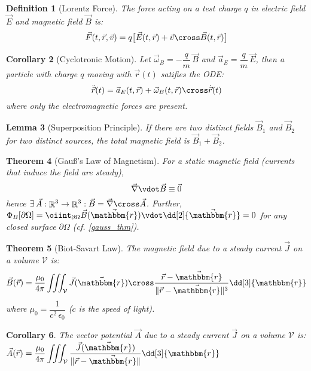 \documentclass[12pt]{article}
\renewcommand{\div}{\vec{\nabla}\vdot}
\renewcommand{\curl}{\vec{\nabla}\cross}
\newcommand{\Exist}[1]{\exists\,{#1}:}
\DeclareMathOperator{\R}{\mathbb{R}}
\newcommand*{\rv}{\vec{r}}
\newcommand*{\ir}{\mathbbm{r}}
\newcommand*{\irv}{\vec{\mathbbm{r}}}
\newcommand*{\vE}{\vec{E}}
\newcommand*{\vB}{\vec{B}}
\newcommand*{\vJ}{\vec{J}}
\newcommand*{\vA}{\vec{A}}
\newcommand*{\ee}{\epsilon_0}
\newcommand*{\mmu}{\mu_0}
\newcommand*{\vol}{\mathcal{V}}
\newtheorem{theorem}{Theorem}[subsection]
\newtheorem{definition}[theorem]{Definition}
\newtheorem{lemma}[theorem]{Lemma}
\newtheorem{corollary}[theorem]{Corollary}
\begin{document}
\begin{definition}[Lorentz Force]
  \label{lorentz_force}
  The force acting on a test charge $q$ in electric field $\vE$ and magnetic field $\vB$ is:
  $$\vec{F}(t,\rv,\vec{v})=q\big[\vE(t,\rv)+\vec{v}\cross\vB(t,\rv)\big]$$
\end{definition}

\begin{corollary}[Cyclotronic Motion]
  Let $\vec{\omega}_B=-\dfrac{q}{m}\,\vB$ and $\vec{a}_E=\dfrac{q}{m}\,\vE$, then a particle with charge $q$ moving with $\rv(t)$ satifies the ODE: $$\ddot{\rv}(t)=\vec{a}_E(t,\rv)+\vec{\omega}_B(t,\rv)\cross\dot{\rv}(t)$$ where only the electromagnetic forces are present.
\end{corollary}

\begin{lemma}[Superposition Principle]
  If there are two distinct fields $\vB_1$ and $\vB_2$ for two distinct sources, the total magnetic field is $\vB_1+\vB_2$.
\end{lemma}

\begin{theorem}[Gauß's Law of Magnetism]
  \label{gauss_magnetism}
  For a static magnetic field (currents that induce the field are steady), $$\div\vB\equiv\vec{0}$$ hence $\Exist{\vA:\R^3\to\R^3}\vB=\curl\vA$. Further, $\Phi_B[\partial\Omega]=\displaystyle\oiint_{\partial\Omega}\vB(\irv)\vdot\dd[2]{\irv}=0$ for any closed surface $\partial\Omega$ (cf. \ref{gauss_thm}).
\end{theorem}

\begin{theorem}[Biot-Savart Law]
  \label{biot_savart}
  The magnetic field due to a steady current $\vJ$ on a volume $\vol$ is: $$\vB(\rv)=\frac{\mmu}{4\pi}\iiint_{\vol}\vJ(\irv)\cross\frac{\rv-\irv}{\|\rv-\irv\|^3}\dd[3]{\ir}$$ where $\mmu=\dfrac{1}{c^2\,\ee}$ ($c$ is the speed of light).
\end{theorem}

\begin{corollary}
  \label{vector_potential}
  The vector potential $\vA$ due to a steady current $\vJ$ on a volume $\vol$ is: $\displaystyle\vA(\rv)=\frac{\mmu}{4\pi}\iiint_{\vol}\frac{\vJ(\irv)}{\|\rv-\irv\|}\dd[3]{\ir}$
\end{corollary}
\end{document}
